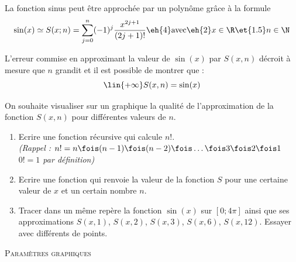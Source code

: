 \clearpage
\begin{boxexstheorieligne}
\exo
La fonction sinus peut être approchée par un polynôme grâce à la formule
$$\sin(x)\simeq S(x; n)=\sum_{j=0}^n(-1)^j\frac{x^{2j+1}}{(2j+1)!} \eh{4}\textrm{avec}\eh{2}x\in\R\et{1.5}n\in\N$$

L'erreur commise en approximant la valeur de $\sin(x)$ par $S(x,n)$ décroit à mesure que $n$ grandit et il est possible de montrer que :
$$\lin{+\infty}S(x,n)=\sin(x)$$

On souhaite visualiser sur un graphique la qualité de l'approximation de la fonction $S(x,n)$ pour différentes valeurs de $n$.

\begin{enumerate}[label=\alph*),itemsep=1mm,left=0mm]
\item Ecrire une fonction récursive  qui calcule $n!$.\\
\textit{\small(Rappel : $n!=n\fois (n-1)\fois (n-2)\fois \ldots \fois 3 \fois 2\fois 1$  $0!=1$ par définition)}
\item Ecrire une fonction  qui renvoie la valeur de la fonction $S$ pour une certaine valeur de $x$ et un certain nombre $n$.
\item Tracer dans un même repère la fonction $\sin(x)$ sur $[0;4\pi]$ ainsi que ses approximations $S(x,1)$, $S(x,2)$, $S(x,3)$, $S(x,6)$, $S(x,12)$. Essayer avec différents  de points. 
\end{enumerate}
\end{boxexstheorieligne}


\bigskip
\begin{center}
\textsc{\Large Paramètres graphiques}
\end{center}

